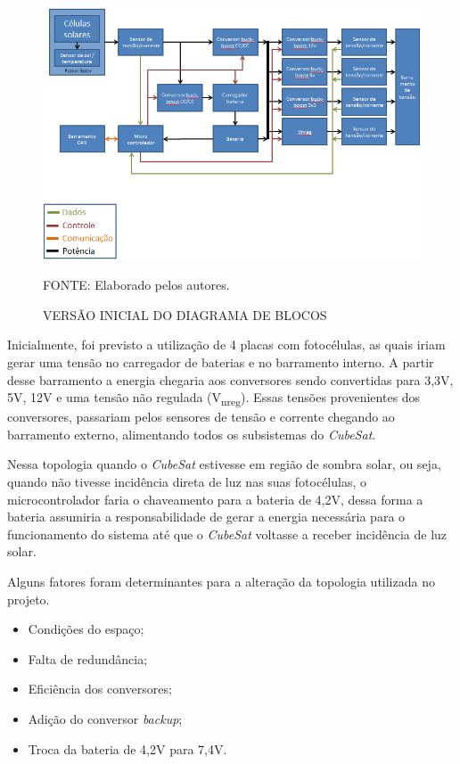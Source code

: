\documentclass[
	12pt,				%
	openright,			%
	oneside,			%
	a4paper,			%
	english,			%
	french,				%
	spanish,			%
	brazil,				%
	oldfontcommands
	]{abntex2}
\begin{document}
	\begin{figure}[th]
		\caption{VERSÃO INICIAL DO DIAGRAMA DE BLOCOS}
		\label{Fig_Diag_Blocos_Inicial}
		\centering
		\includegraphics[width=1.0\linewidth]{./figs/diag_blocos_inicial}
			
		\begin{small}
			FONTE: Elaborado pelos autores.
		\end{small}		
	\end{figure}	
	\pagebreak

	Inicialmente, foi previsto a utilização de 4 placas com fotocélulas, as quais iriam gerar uma tensão no carregador de baterias e no barramento interno. A partir desse barramento a energia chegaria aos conversores sendo convertidas para 3,3V, 5V, 12V e uma tensão não regulada (V\textsubscript{nreg}). Essas tensões provenientes dos conversores, passariam pelos sensores de tensão e corrente chegando ao barramento externo, alimentando todos os subsistemas do \textit{CubeSat}.
	
	Nessa topologia quando o \textit{CubeSat} estivesse em região de sombra solar, ou seja, quando não tivesse incidência direta de luz nas suas fotocélulas, o microcontrolador faria o chaveamento para a bateria de 4,2V, dessa forma a bateria assumiria a responsabilidade de gerar a energia necessária para o funcionamento do sistema até que o \textit{CubeSat} voltasse a receber incidência de luz solar.
	
	Alguns fatores foram determinantes para a alteração da topologia utilizada no projeto.
	
	\begin{minipage}{7cm}	
		\begin{itemize}
			\item	Condições do espaço;
			\item	Falta de redundância;
			\item	Eficiência dos conversores;
		\end{itemize}
	\end{minipage}
	\begin{minipage}{7cm}
		\begin{itemize}
			\item	Adição do conversor \textit{backup};
			\item	Troca da bateria de 4,2V para 7,4V.
		\end{itemize}
	\end{minipage}
	\pagebreak
	
\end{document}
